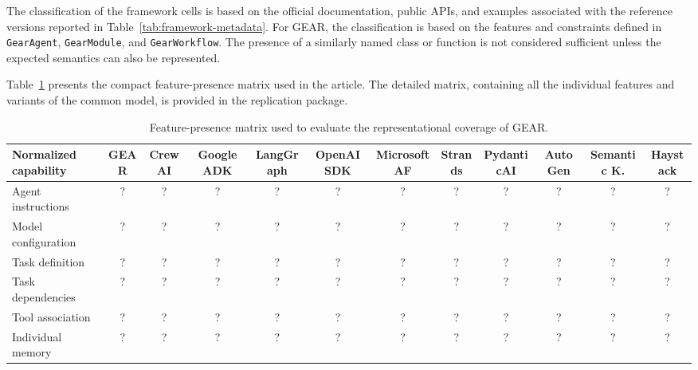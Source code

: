 The classification of the framework cells is based on the official
documentation, public APIs, and examples associated with the reference
versions reported in Table~\ref{tab:framework-metadata}. For GEAR, the
classification is based on the features and constraints defined in
\texttt{GearAgent}, \texttt{GearModule}, and \texttt{GearWorkflow}. The
presence of a similarly named class or function is not considered sufficient
unless the expected semantics can also be represented.

Table~\ref{tab:feature-presence-matrix} presents the compact
feature-presence matrix used in the article. The detailed matrix, containing
all the individual features and variants of the common model, is provided in
the replication package.

\begin{table}[t]
    \centering
    \caption{Feature-presence matrix used to evaluate the representational
    coverage of GEAR.}
    \label{tab:feature-presence-matrix}
    \scriptsize
    \setlength{\tabcolsep}{2pt}
    \renewcommand{\arraystretch}{1.08}
    \begin{tabularx}{\textwidth}{
        @{}
        >{\raggedright\arraybackslash}X
        ccccccccccc
        @{}
    }
        \toprule
        \textbf{Normalized capability}
        & \textbf{GEAR}
        & \textbf{CrewAI}
        & \textbf{Google ADK}
        & \textbf{LangGraph}
        & \textbf{OpenAI SDK}
        & \textbf{Microsoft AF}
        & \textbf{Strands}
        & \textbf{PydanticAI}
        & \textbf{AutoGen}
        & \textbf{Semantic K.}
        & \textbf{Haystack} \\
        \midrule
        
        Agent instructions
        & ? & ? & ? & ? & ? & ? & ? & ? & ? & ? & ? \\

        Model configuration
        & ? & ? & ? & ? & ? & ? & ? & ? & ? & ? & ? \\

        Task definition
        & ? & ? & ? & ? & ? & ? & ? & ? & ? & ? & ? \\

        Task dependencies
        & ? & ? & ? & ? & ? & ? & ? & ? & ? & ? & ? \\

        Tool association
        & ? & ? & ? & ? & ? & ? & ? & ? & ? & ? & ? \\

        Individual memory
        & ? & ? & ? & ? & ? & ? & ? & ? & ? & ? & ? \\


\end{tabularx}
\end{table}
